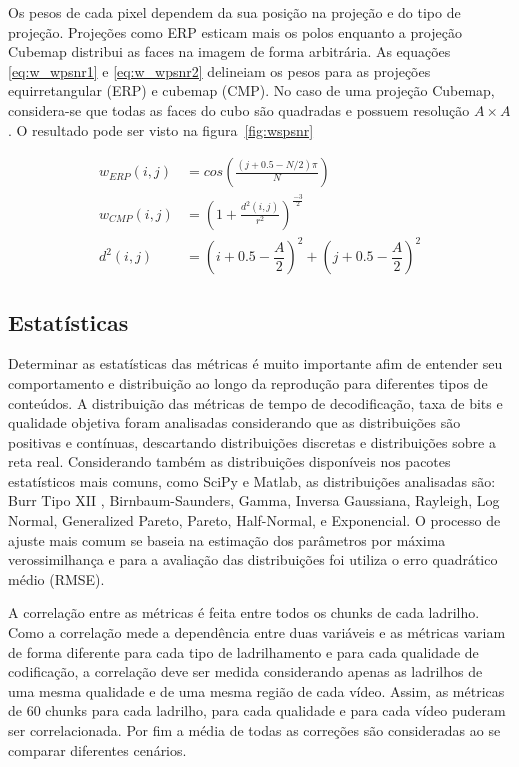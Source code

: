 Os pesos de cada pixel dependem da sua posição na projeção e do tipo de projeção. Projeções como ERP esticam mais os polos enquanto a projeção Cubemap distribui as faces na imagem de forma arbitrária. As equações \ref{eq:w_wpsnr1} e \ref{eq:w_wpsnr2} delineiam os pesos para as projeções equirretangular (ERP) e cubemap (CMP). No caso de uma projeção Cubemap, considera-se que todas as faces do cubo são quadradas e possuem resolução $A \times A$. O resultado pode ser visto na figura~\ref{fig:wspsnr}

\begin{align}
    \label{eq:w_wpsnr1}
    w_{ERP}(i,j)&=cos\left(\frac{(j+0.5-N/2)\pi}{N}\right) \\
    \label{eq:w_wpsnr2}
    w_{CMP}(i,j)&=\left(1 + \frac{d^2(i,j)}{r^2}\right)^{\frac{-3}{2}} \\
    d^2(i, j)&=(i+0.5-\dfrac{A}{2})^2 +(j+0.5-\dfrac{A}{2})^2
\end{align}

\subsection{Estatísticas}

Determinar as estatísticas das métricas é muito importante afim de entender seu comportamento e distribuição ao longo da reprodução para diferentes tipos de conteúdos. A distribuição das métricas de tempo de decodificação, taxa de bits e qualidade objetiva foram analisadas considerando que as distribuições são positivas e contínuas, descartando distribuições discretas e distribuições sobre a reta real. Considerando também as distribuições disponíveis nos pacotes estatísticos mais comuns, como SciPy e Matlab, as distribuições analisadas são: Burr Tipo XII , Birnbaum-Saunders, Gamma, Inversa Gaussiana, Rayleigh, Log Normal, Generalized Pareto, Pareto, Half-Normal, e Exponencial. O processo de ajuste mais comum se baseia na estimação dos parâmetros por máxima verossimilhança e para a avaliação das distribuições foi utiliza o erro quadrático médio (RMSE).

A correlação entre as métricas é feita entre todos os chunks de cada ladrilho. Como a correlação mede a dependência entre duas variáveis e as métricas variam de forma diferente para cada tipo de ladrilhamento e para cada qualidade de codificação, a correlação deve ser medida considerando apenas as ladrilhos de uma mesma qualidade e de uma mesma região de cada vídeo. Assim, as métricas de 60 chunks para cada ladrilho, para cada qualidade e para cada vídeo puderam ser correlacionada. Por fim a média de todas as correções são consideradas ao se comparar diferentes cenários.

